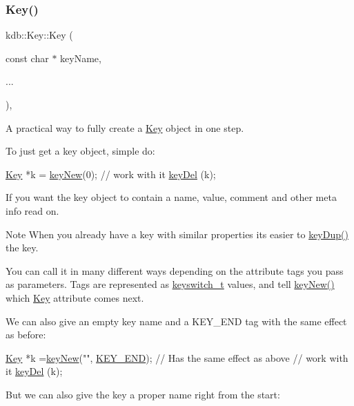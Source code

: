 \subsubsection{\texorpdfstring{Key()}{Key()}\hspace{0.1cm}{\footnotesize\ttfamily [5/7]}}
{\footnotesize\ttfamily kdb\+::\+Key\+::\+Key (\begin{DoxyParamCaption}\item[{const char $\ast$}]{key\+Name,  }\item[{}]{... }\end{DoxyParamCaption})\hspace{0.3cm}{\ttfamily [inline]}, {\ttfamily [explicit]}}



A practical way to fully create a \hyperlink{classkdb_1_1Key}{Key} object in one step. 

To just get a key object, simple do\+:


\begin{DoxyCodeInclude}
\hyperlink{classkdb_1_1Key_a5679f5cae63caddd64a60388b9cc77fa}{Key} *k = \hyperlink{group__key_gad23c65b44bf48d773759e1f9a4d43b89}{keyNew}(0);
\textcolor{comment}{// work with it}
\hyperlink{group__key_ga3df95bbc2494e3e6703ece5639be5bb1}{keyDel} (k);
\end{DoxyCodeInclude}
 If you want the key object to contain a name, value, comment and other meta info read on.

\begin{DoxyNote}{Note}
When you already have a key with similar properties its easier to \hyperlink{group__key_gae6ec6a60cc4b8c1463fa08623d056ce3}{key\+Dup()} the key.
\end{DoxyNote}
You can call it in many different ways depending on the attribute tags you pass as parameters. Tags are represented as \hyperlink{group__key_ga91fb3178848bd682000958089abbaf40}{keyswitch\+\_\+t} values, and tell \hyperlink{group__key_gad23c65b44bf48d773759e1f9a4d43b89}{key\+New()} which \hyperlink{classkdb_1_1Key}{Key} attribute comes next.

We can also give an empty key name and a K\+E\+Y\+\_\+\+E\+ND tag with the same effect as before\+:


\begin{DoxyCodeInclude}
\hyperlink{classkdb_1_1Key_a5679f5cae63caddd64a60388b9cc77fa}{Key} *k =\hyperlink{group__key_gad23c65b44bf48d773759e1f9a4d43b89}{keyNew}(\textcolor{stringliteral}{""}, \hyperlink{group__key_gga91fb3178848bd682000958089abbaf40aa8adb6fcb92dec58fb19410eacfdd403}{KEY\_END}); \textcolor{comment}{// Has the same effect as above}
\textcolor{comment}{// work with it}
\hyperlink{group__key_ga3df95bbc2494e3e6703ece5639be5bb1}{keyDel} (k);
\end{DoxyCodeInclude}
 But we can also give the key a proper name right from the start\+:


